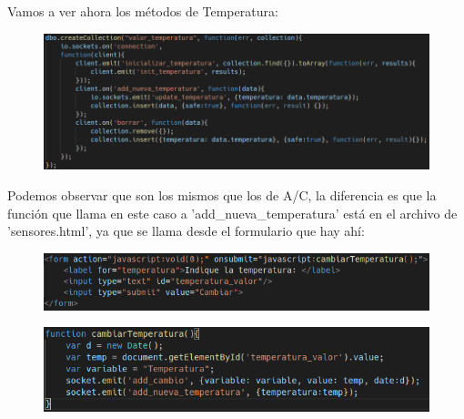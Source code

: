 \documentclass{article}
\begin{document}
	Vamos a ver ahora los métodos de Temperatura:
	\begin{figure}[H]
		\centering
		\includegraphics[totalheight=4.4cm]{img/14.png}
	\end{figure}
	Podemos observar que son los mismos que los de A/C, la diferencia es que la función que llama en este caso a 'add\_nueva\_temperatura' está en el archivo de 'sensores.html', ya que se llama desde el formulario que hay ahí:
	\begin{figure}[H]
		\centering
		\includegraphics[totalheight=1.85cm]{img/15.png}
	\end{figure}
	\begin{figure}[H]
		\centering
		\includegraphics[totalheight=2.75cm]{img/16.png}
	\end{figure}
\end{document}
